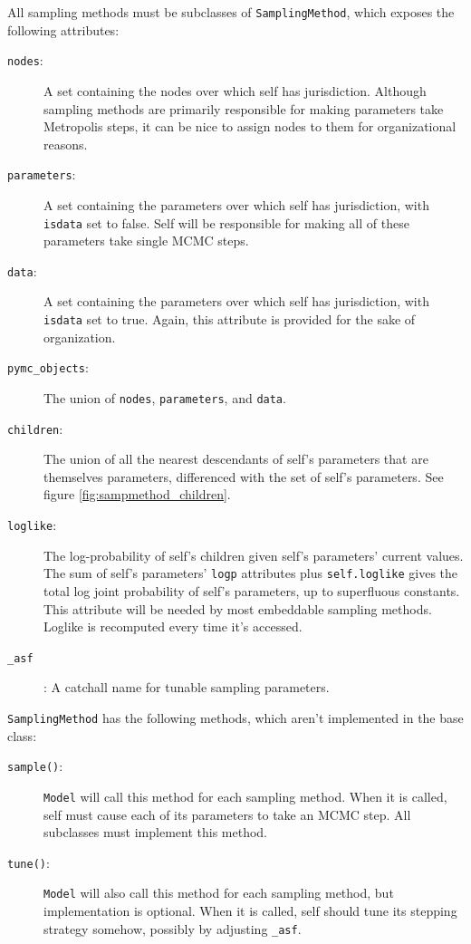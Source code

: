 \documentclass[]{book}
\begin{document}
All sampling methods must be subclasses of \texttt{SamplingMethod}, which exposes the following attributes:
\begin{description}
    \item[\texttt{nodes}:] A set containing the nodes over which self has jurisdiction. Although sampling methods are primarily responsible for making parameters take Metropolis steps, it can be nice to assign nodes to them for organizational reasons.
    \item[\texttt{parameters}:] A set containing the parameters over which self has jurisdiction, with \texttt{isdata} set to false. Self will be responsible for making all of these parameters take single MCMC steps.
    \item[\texttt{data}:] A set containing the parameters over which self has jurisdiction, with \texttt{isdata} set to true. Again, this attribute is provided for the sake of organization.
    \item[\texttt{pymc\_objects}:] The union of \texttt{nodes}, \texttt{parameters}, and \texttt{data}.
    \item[\texttt{children}:] The union of all the nearest descendants of self's parameters that are themselves parameters, differenced with the set of self's parameters. See figure \ref{fig:sampmethod_children}.
    \item[\texttt{loglike}:] The log-probability of self's children given self's parameters' current values. The sum of self's parameters' \texttt{logp} attributes plus \texttt{self.loglike}  gives the total log joint probability of self's parameters, up to superfluous constants. This attribute will be needed by most embeddable sampling methods. Loglike is recomputed every time it's accessed.
    \item[\texttt{\_asf}]: A catchall name for tunable sampling parameters.
\end{description}

\texttt{SamplingMethod} has the following methods, which aren't implemented in the base class:
\begin{description}
    \item[\texttt{sample()}:] \texttt{Model} will call this method for each sampling method. When it is called, self must cause each of its parameters to take an MCMC step. All subclasses must implement this method.
    \item[\texttt{tune()}:] \texttt{Model} will also call this method for each sampling method, but implementation is optional. When it is called, self should tune its stepping strategy somehow, possibly by adjusting \texttt{\_asf}.
\end{description}
\end{document}

